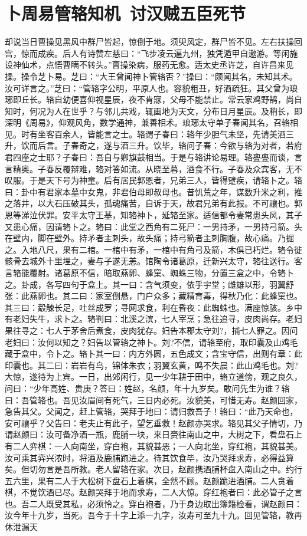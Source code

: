 \chapter{卜周易管辂知机~讨汉贼五臣死节}

却说当日曹操见黑风中群尸皆起，惊倒于地。须臾风定，群尸皆不见。左右扶操回宫，惊而成疾。后人有诗赞左慈曰：“飞步凌云遍九州，独凭遁甲自遨游。等闲施设神仙术，点悟曹瞒不转头。”曹操染病，服药无愈。适太史丞许芝，自许昌来见操。操令芝卜易。芝曰：“大王曾闻神卜管辂否？”操曰：“颇闻其名，未知其术。汝可详言之。”芝曰：“管辂字公明，平原人也。容貌粗丑，好酒疏狂。其父曾为琅琊即丘长。辂自幼便喜仰视星辰，夜不肯寐，父母不能禁止。常云家鸡野鹄，尚自知时，何况为人在世乎？与邻儿共戏，辄画地为天文，分布日月星辰。及稍长，即深明《周易》，仰观风角，数学通神，兼善相术。琅琊太守单子春闻其名，召辂相见。时有坐客百余人，皆能言之士。辂谓子春曰：辂年少胆气未坚，先请美酒三升，饮而后言。子春奇之，遂与酒三升。饮毕，辂问子春：今欲与辂为对者，若府君四座之士耶？子春曰：吾自与卿旗鼓相当。于是与辂讲论易理。辂亹亹而谈，言言精奥。子春反覆辩难，辂对答如流。从晓至暮，酒食不行。子春及众宾客，无不叹服。于是天下号为神童。后有居民郭恩者，兄弟三人，皆得躄疾，请辂卜之。辂曰：卦中有君家本墓中女鬼，非君伯母即叔母也。昔饥荒之年，谋数升米之利，推之落井，以大石压破其头，孤魂痛苦，自诉于天，故君兄弟有此报。不可禳也。郭恩等涕泣伏罪。安平太守王基，知辂神卜，延辂至家。适信都令妻常患头风，其子又患心痛，因请辂卜之。辂曰：此堂之西角有二死尸：一男持矛，一男持弓箭。头在壁内，脚在壁外。持矛者主刺头，故头痛；持弓箭者主刺胸腹，故心痛。乃掘之。入地八尺，果有二棺。一棺中有矛，一棺中有角弓及箭，木俱已朽烂。辂令徙骸骨去城外十里埋之，妻与子遂无恙。馆陶令诸葛原，迁新兴太守，辂往送行。客言辂能覆射。诸葛原不信，暗取燕卵、蜂窠、蜘蛛三物，分置三盒之中，令辂卜之。卦成，各写四句于盒上。其一曰：含气须变，依乎宇堂；雌雄以形，羽翼舒张：此燕卵也。其二曰：家室倒悬，门户众多；藏精育毒，得秋乃化：此蜂窠也。其三曰：觳觫长足，吐丝成罗；寻网求食，利在昏夜：此蜘蛛也。满座惊骇。乡中有老妇失牛，求卜之。辂判曰：北溪之滨，七人宰烹；急往追寻，皮肉尚存。老妇果往寻之：七人于茅舍后煮食，皮肉犹存。妇告本郡太守刘?，捕七人罪之。因问老妇曰：汝何以知之？妇告以管辂之神卜。刘?不信，请辂至府，取印囊及山鸡毛藏于盒中，令卜之。辂卜其一曰：内方外圆，五色成文；含宝守信，出则有章：此印囊也。其二曰：岩岩有鸟，锦体朱衣；羽翼玄黄，鸣不失晨：此山鸡毛也。刘?大惊，遂待为上宾。一日，出郊闲行，见一少年耕于田中，辂立道傍，观之良久，问曰：“少年高姓、贵庚？答曰：姓赵，名颜，年十九岁矣。敢问先生为谁？辂曰：吾管辂也。吾见汝眉间有死气，三日内必死。汝貌美，可惜无寿。赵颜回家，急告其父。父闻之，赶上管辂，哭拜于地曰：请归救吾子！辂曰：“此乃天命也，安可禳乎？父告曰：老夫止有此子，望乞垂救！赵颜亦哭求。辂见其父子情切，乃谓赵颜曰：汝可备净酒一瓶，鹿脯一块，来日赍往南山之中，大树之下，看盘石上有二人弈棋：一人向南坐，穿白袍，其貌甚恶；一人向北坐，穿红袍，其貌甚美。汝可乘其弈兴浓时，将酒及鹿脯跑进之。待其饮食毕，汝乃哭拜求寿，必得益算矣。但切勿言是吾所教。老人留辂在家。次日，赵颜携酒脯杯盘入南山之中。约行五六里，果有二人于大松树下盘石上着棋，全然不顾。赵颜跪进酒脯。二人贪着棋，不觉饮酒已尽。赵颜哭拜于地而求寿，二人大惊。穿红袍者曰：此必管子之言也。吾二人既受其私，必须怜之。穿白袍者，乃于身边取出簿籍检看，谓赵颜曰：汝今年十九岁，当死。吾今于十字上添一九字，汝寿可至九十九。回见管辂，教再休泄漏天